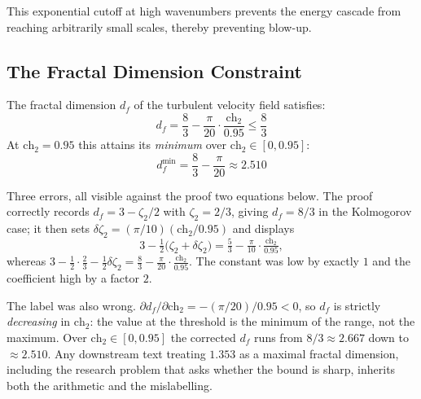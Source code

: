 This exponential cutoff at high wavenumbers prevents the energy cascade from reaching arbitrarily small scales, thereby preventing blow-up.

\subsection{The Fractal Dimension Constraint}

\begin{lemma}
\label{lem:fractal_dimension_bound}
The fractal dimension $d_f$ of the turbulent velocity field satisfies:
\begin{equation}
d_f = \frac{8}{3} - \frac{\pi}{20} \cdot \frac{\text{ch}_2}{0.95} \leq \frac{8}{3}
\end{equation}
At $\text{ch}_2 = 0.95$ this attains its \emph{minimum} over
$\text{ch}_2 \in [0, 0.95]$:
\begin{equation}
d_f^{\min} = \frac{8}{3} - \frac{\pi}{20} \approx 2.510
\end{equation}

\begin{remark}
\label{rem:df-correction-2026-10-03}
Three errors, all visible against the proof two equations below. The proof
correctly records $d_f = 3 - \zeta_2/2$ with $\zeta_2 = 2/3$, giving
$d_f = 8/3$ in the Kolmogorov case; it then sets
$\delta\zeta_2 = (\pi/10)(\text{ch}_2/0.95)$ and displays
\[
3 - \tfrac12\bigl(\zeta_2 + \delta\zeta_2\bigr) = \tfrac53 - \tfrac{\pi}{10}\cdot\tfrac{\text{ch}_2}{0.95},
\]
whereas $3 - \tfrac12\cdot\tfrac23 - \tfrac12\delta\zeta_2
= \tfrac83 - \tfrac{\pi}{20}\cdot\tfrac{\text{ch}_2}{0.95}$. The constant was
low by exactly $1$ and the coefficient high by a factor $2$.

The label was also wrong. $\partial d_f/\partial\text{ch}_2 = -(\pi/20)/0.95 < 0$,
so $d_f$ is strictly \emph{decreasing} in $\text{ch}_2$: the value at the
threshold is the minimum of the range, not the maximum. Over
$\text{ch}_2 \in [0,0.95]$ the corrected $d_f$ runs from $8/3 \approx 2.667$ down
to $\approx 2.510$. Any downstream text treating $1.353$ as a maximal fractal
dimension, including the research problem that asks whether the bound is sharp,
inherits both the arithmetic and the mislabelling.
\end{remark}
\end{lemma}

